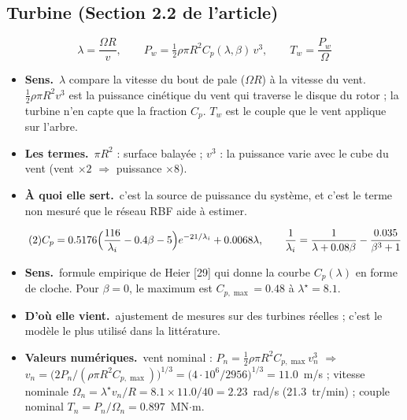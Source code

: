 \documentclass[11pt,a4paper]{article}
\newenvironment{expl}{\begin{itemize}[leftmargin=1.2em,itemsep=2pt,topsep=2pt]}{\end{itemize}}
\newcommand{\sens}{\item \textbf{Sens.}~}
\newcommand{\termes}{\item \textbf{Les termes.}~}
\newcommand{\origine}{\item \textbf{D'où elle vient.}~}
\newcommand{\num}{\item \textbf{Valeurs numériques.}~}
\newcommand{\role}{\item \textbf{À quoi elle sert.}~}
\begin{document}
\subsection{Turbine (Section 2.2 de l'article)}
\begin{equation}\tag{1}
\lambda=\frac{\Omega R}{v},\qquad P_w=\tfrac{1}{2}\rho\pi R^2 C_p(\lambda,\beta)\,v^3,\qquad T_w=\frac{P_w}{\Omega}
\end{equation}
\begin{expl}
\sens $\lambda$ compare la vitesse du bout de pale ($\Omega R$) à la vitesse du vent. $\frac12\rho\pi R^2v^3$
est la puissance cinétique du vent qui traverse le disque du rotor ; la turbine n'en capte que la fraction
$C_p$. $T_w$ est le couple que le vent applique sur l'arbre.
\termes $\pi R^2$ : surface balayée ; $v^3$ : la puissance varie avec le cube du vent (vent $\times2$ $\Rightarrow$
puissance $\times8$).
\role c'est la source de puissance du système, et c'est le terme non mesuré que le réseau RBF aide à estimer.
\end{expl}

\begin{equation}\tag{2}
C_p = 0.5176\Bigl(\frac{116}{\lambda_i}-0.4\beta-5\Bigr)e^{-21/\lambda_i}+0.0068\lambda,\qquad
\frac{1}{\lambda_i}=\frac{1}{\lambda+0.08\beta}-\frac{0.035}{\beta^3+1}
\end{equation}
\begin{expl}
\sens formule empirique de Heier [29] qui donne la courbe $C_p(\lambda)$ en forme de cloche. Pour $\beta=0$, le maximum est $C_{p,\max}=0.48$ à $\lambda^\star=8.1$.
\origine ajustement de mesures sur des turbines réelles ; c'est le modèle le plus utilisé dans la littérature.
\num vent nominal : $P_n=\frac12\rho\pi R^2C_{p,\max}v_n^3$ $\Rightarrow$
$v_n=\bigl(2P_n/(\rho\pi R^2C_{p,\max})\bigr)^{1/3}=\bigl(4\cdot10^6/2956\bigr)^{1/3}=11.0$~m/s ;
vitesse nominale $\Omega_n=\lambda^\star v_n/R=8.1\times11.0/40=2.23$~rad/s (21.3~tr/min) ;
couple nominal $T_n=P_n/\Omega_n=0.897$~MN$\cdot$m.
\end{expl}
\end{document}
